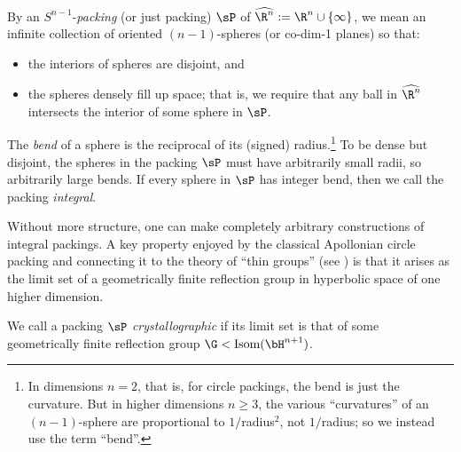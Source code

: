 \documentclass[12pt,reqno]{amsart}
\begin{document}

\begin{Def}
By an $S^{n-1}$-{\it packing} (or just  {packing}) $\sP$ 
of 
 $\widehat{\R^{n}}:=\R^{n}\cup\{\infty\}$, we mean an infinite collection of {oriented} $(n-1)$-spheres (or  co-dim-1 planes)  so that:
 \begin{itemize}
 \item the interiors of spheres are disjoint,
 and
 \item the spheres
  densely fill up space; that is, we require that
any ball in $\widehat{\R^{n}}$ intersects the interior of some sphere in $\sP$. %
\end{itemize}
The 
 {\it bend} of a sphere is the reciprocal of its (signed) radius.\footnote{In dimensions $n=2$, that is, for circle packings, the bend is just the curvature. But in higher dimensions $n\ge3$, the various ``curvatures''  
of an $(n-1)$-sphere are proportional to $1/$radius$^{2}$, not $1/$radius; so we instead use the term ``bend''.}
To be dense but disjoint, the spheres in the packing $\sP$ must have arbitrarily small radii, so arbitrarily large bends.
If every sphere in $\sP$ has integer bend,
then we call the  packing  {\it integral}. 
\end{Def}

Without more structure, one can make completely arbitrary constructions of integral packings. 
A key property enjoyed by the classical Apollonian circle packing and connecting it to the theory of ``thin groups'' (see \cite{Sarnak2014, Kontorovich2014}) is that
 it arises as
  the limit set of a geometrically finite reflection group in  hyperbolic space of one higher dimension.


\begin{Def}
We call a %
packing $\sP$
   {\it 
   crystallographic}
if 
its limit set is that of
some
 geometrically finite
 reflection group
 $\G<\text{Isom}(\bH^{n+1})$.
\end{Def}
\end{document}
